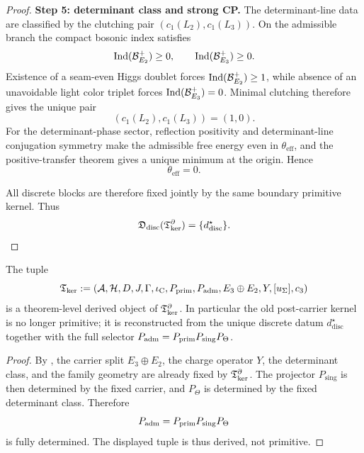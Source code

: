 \begin{proof}
\textbf{Step 5: determinant class and strong CP.}
The determinant-line data are classified by the clutching pair $(c_1(L_2),c_1(L_3))$. On the
admissible branch the compact bosonic index satisfies
\[
\operatorname{Ind}(\mathcal B_{E_2}^+)\ge 0,
\qquad
\operatorname{Ind}(\mathcal B_{E_3}^+)\ge 0.
\]
Existence of a seam-even Higgs doublet forces $\operatorname{Ind}(\mathcal B_{E_2}^+)\ge 1$, while absence of an
unavoidable light color triplet forces $\operatorname{Ind}(\mathcal B_{E_3}^+)=0$. Minimal clutching therefore
gives the unique pair
\[
(c_1(L_2),c_1(L_3))=(1,0).
\]
For the determinant-phase sector, reflection positivity and determinant-line conjugation symmetry
make the admissible free energy even in $\theta_{\mathrm{eff}}$, and the positive-transfer theorem
gives a unique minimum at the origin. Hence
\[
\theta_{\mathrm{eff}}=0.
\]

All discrete blocks are therefore fixed jointly by the same boundary primitive kernel. Thus
\[
\mathfrak D_{\mathrm{disc}}(\mathfrak T_{\mathrm{ker}}^\partial)=\{d^\star_{\mathrm{disc}}\}.
\]
\end{proof}

\begin{corollary}
\label{cor:derived-post-carrier-kernel}
The tuple
\[
\mathfrak T_{\mathrm{ker}}
:=
(\mathcal A,\mathcal H,D,J,\Gamma,\iota_{\mathrm C},P_{\mathrm{prim}},P_{\mathrm{adm}},E_3\oplus E_2,Y,[u_\Sigma],c_3)
\]
is a theorem-level derived object of $\mathfrak T_{\mathrm{ker}}^\partial$. In particular the old post-carrier kernel is
no longer primitive; it is reconstructed from the unique discrete datum $d^\star_{\mathrm{disc}}$
together with the full selector $P_{\mathrm{adm}}=P_{\mathrm{prim}} P_{\mathrm{sing}}P_\Theta$.
\end{corollary}

\begin{proof}
By , the carrier split $E_3\oplus E_2$, the charge
operator $Y$, the determinant class, and the family geometry are already fixed by
$\mathfrak T_{\mathrm{ker}}^\partial$. The projector $P_{\mathrm{sing}}$ is then determined by the fixed carrier, and
$P_\Theta$ is determined by the fixed determinant class. Therefore
\[
P_{\mathrm{adm}}=P_{\mathrm{prim}} P_{\mathrm{sing}}P_\Theta
\]
is fully determined. The displayed tuple is thus derived, not primitive.
\end{proof}

